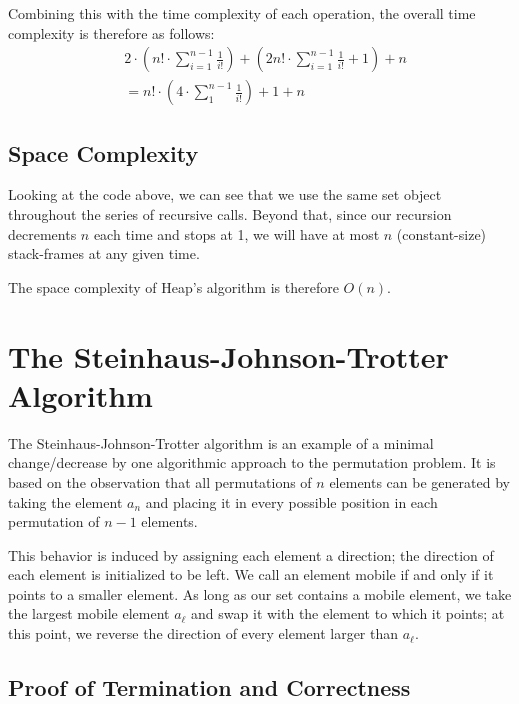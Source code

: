 \documentclass[10pt, oneside]{article}   	%
\begin{document}
Combining this with the time complexity of each operation, the overall time complexity is therefore as follows:
\begin{align*}
	&2 \cdot \left( n! \cdot \sum_{i = 1}^{n - 1} \frac{1}{i!} \right) + \left( 2n! \cdot \sum_{i = 1}^{n - 1} \frac{1}{i!} + 1 \right) + n \\
	&= n! \cdot \left( 4 \cdot \sum_{1}^{n - 1} \frac{1}{i!} \right) + 1 + n
\end{align*}

\subsection{Space Complexity}

Looking at the code above, we can see that we use the same set object throughout the series of recursive calls. Beyond that, since our recursion decrements $n$ each time and stops at 1, we will have at most $n$ (constant-size) stack-frames at any given time.

The space complexity of Heap's algorithm is therefore $O(n)$.

\section{The Steinhaus-Johnson-Trotter Algorithm}
\newtheorem{axiom}{Axiom}[section]
\newtheorem{lemma}{Lemma}[section]

The Steinhaus-Johnson-Trotter algorithm is an example of a minimal change/decrease by one algorithmic approach to the permutation problem. It is based on the observation that all permutations of $n$ elements can be generated by taking the element $a_{n}$ and placing it in every possible position in each permutation of $n - 1$ elements.

This behavior is induced by assigning each element a direction; the direction of each element is initialized to be left. We call an element mobile if and only if it points to a smaller element. As long as our set contains a mobile element, we take the largest mobile element $a_{\ell}$ and swap it with the element to which it points; at this point, we reverse the direction of every element larger than $a_{\ell}$.

\subsection{Proof of Termination and Correctness}
\end{document}
